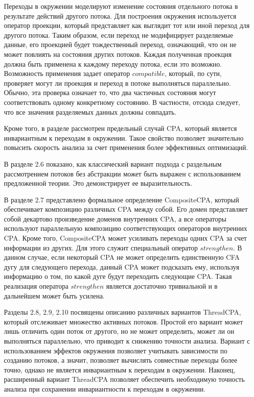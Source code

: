 Переходы в окружении моделируют изменение состояния отдельного потока в результате действий другого потока.
Для построения окружения используется оператор проекции, который представляет как выглядит тот или иной переход для другого потока.
Таким образом, если переход не модифицирует разделяемые данные, его проекцией будет тождественный переход, означающий, что он не может повлиять на состояния других потоков.
Каждая полученная проекция должна быть применена к каждому переходу потока, если это возможно.
Возможность применения задает оператор $compatible$, который, по сути, проверяет могут ли проекция и переход в потоке выполняться параллельно. 
Обычно, эта проверка означает то, что два частичных состояния могут соответствовать одному конкретному состоянию.
В частности, отсюда следует, что все значения разделяемых данных должны совпадать.

Кроме того, в разделе рассмотрен предельный случай CPA, который является инвариантным к переходам в окружении.
Такое свойство позволяет значительно повысить скорость анализа за счет применения более эффективных оптимизаций.

В разделе 2.6 показано, как классический вариант подхода с раздельным рассмотрением потоков без абстракции может быть выражен с использованием предложенной теории. 
Это демонстрирует ее выразительность.

В разделе 2.7 представлено формальное определение CompositeCPA, который обеспечивает композицию различных CPA между собой.
Его домен представляет собой декартово произведение доменов внутренних CPA, а все операторы используют параллельную композицию соответствующих операторов внутренних CPA.
Кроме того, CompositeCPA может усиливать переходы одних CPA за счет информации из других.
Для этого служит специальный оператор $strengthen$.
В данном случае, если некоторый CPA не может определить единственную CFA дугу для следующего перехода, данный CPA может подсказать ему, используя информацию о том, по какой дуге будут переходить следующие CPA.
Такая реализация оператора $strengthen$ является достаточно тривиальной и в дальнейшем может быть усилена.

Разделы 2.8, 2.9, 2.10 посвящены описанию различных вариантов ThreadCPA, который отслеживает множество активных потоков.
Простой его вариант может лишь отличить один поток от другого, но не может определить, может ли он выполняться параллельно, что приводит к снижению точности анализа.
Вариант с использованием эффектов окружения позволяет учитывать зависимости по созданию потоков, а значит, позволяет вычислять совместные переходы более точно, однако не является инвариантным к переходам в окружении.
Наконец, расширенный вариант ThreadCPA позволяет обеспечить необходимую точность анализа при сохранении инвариантности к переходам в окружении.

